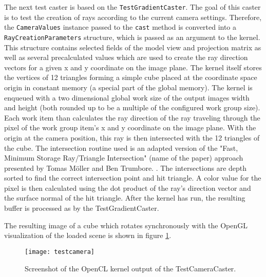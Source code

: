 The next test caster is based on the \lstinline!TestGradientCaster!. The goal of this caster is to test the creation of rays according to the current camera settings. Therefore, the \lstinline!CameraValues! instance passed to the \lstinline!cast! method is converted into a \lstinline!RayCreationParameters! structure, which is passed as an argument to the kernel. This structure contains selected fields of the model view and projection matrix as well as several precalculated values which are used to create the ray direction vectors for a given x and y coordinate on the image plane. The kernel itself stores the vertices of 12 triangles forming a simple cube placed at the coordinate space origin in constant memory (a special part of the global memory). The kernel is enqueued with a two dimensional global work size of the output images width and height (both rounded up to be a multiple of the configured work group size). Each work item than calculates the ray direction of the ray traveling through the pixel of the work group item's x and y coordinate on the image plane. With the origin at the camera position, this ray is then intersected with the 12 triangles of the cube. The intersection routine used is an adapted version of the "Fast, Minimum Storage Ray/Triangle Intersection" (name of the paper) approach presented by Tomas Möller and Ben Trumbore. \cite{triangle_intersection}. The intersections are depth sorted to find the correct intersection point and hit triangle. A color value for the pixel is then calculated using the dot product of the ray's direction vector and the surface normal of the hit triangle. After the kernel has run, the resulting buffer is processed as by the TestGradientCaster.

%

%

The resulting image of a cube which rotates synchronously with the OpenGL visualization of the loaded scene is shown in figure \ref{fig:testcamera}.

\begin{figure}
\centering
\texttt{[image: testcamera]}
\caption{Screenshot of the OpenCL kernel output of the TestCameraCaster.}
\label{fig:testcamera}
\end{figure}


